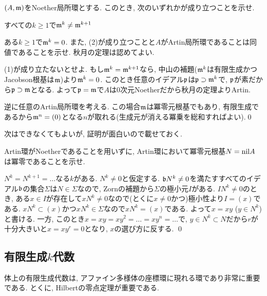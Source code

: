 \begin{egprob}
$(A,\mathfrak{m})$をNoether局所環とする. このとき, 次のいずれかが成り立つことを示せ.
\ben
\item すべての$k\geq 1$で$\mathfrak{m}^k \neq \mathfrak{m}^{k+1}$
\item ある$k\geq 1$で$\mathfrak{m}^{k} = 0$.
\een
また, (2)が成り立つことと$A$がArtin局所環であることは同値であることを示せ. 秋月の定理は認めてよい.
\end{egprob}
\begin{egans}
(1)が成り立たないとせよ. もし$\mathfrak{m}^k = \mathfrak{m}^{k+1}$なら, 中山の補題($\mathfrak{m}^k$は有限生成かつJacobson根基は$\mathfrak{m}$)より$\mathfrak{m}^{k} = 0$. このとき任意のイデアル$\mathfrak{p}$は$\mathfrak{p}\supset \mathfrak{m}^k$で, $\mathfrak{p}$が素だから$\mathfrak{p}\supset \mathfrak{m}$となる. よって$\mathfrak{p} = \mathfrak{m}$で$A$は0次元Noetherだから秋月の定理よりArtin. \par
逆に任意のArtin局所環を考える. この場合$\mathfrak{m}$は冪零元根基でもあり, 有限生成であるから$\mathfrak{m}^n = (0)$となる$n$が取れる(生成元が消える冪乗を総和すればよい).\qed
\end{egans}

次はできなくてもよいが, 証明が面白いので載せておく.
\begin{egprob}
Artin環がNoetherであることを用いずに, Artin環において冪零元根基$N=\mathrm{nil}A$は冪零であることを示せ.
\end{egprob}
\prf $N^k= N^{k+1} = \dots$なる$k$がある. $N^k \neq 0$と仮定する. $\mathfrak{b}N^k\neq 0$を満たすすべてのイデアル$\mathfrak{b}$の集合$\Sigma$は$N\in \Sigma$なので, Zornの補題から$\Sigma$の極小元$I$がある. $IN^k \neq 0$のとき, ある$x\in I$が存在して$xN^k \neq 0$なので(とくに$x\neq 0$かつ)極小性より$I=(x)$である. $xN^k \subset (x)$かつ$xN^k\in \Sigma$なので$xN^k=(x)$である. よって$x=xy$ ($y\in N^k$)と書ける. 一方, このとき$x=xy=xy^2=\dots = xy^n = \dots$で, $y\in N^k \subset N$だから$r$が十分大きいと$x = xy^{r} = 0$となり, $x$の選び方に反する.
\qed


\subsection{有限生成$k$代数}
体上の有限生成代数は, アファイン多様体の座標環に現れる環であり非常に重要である. とくに, Hilbertの零点定理が重要である.

